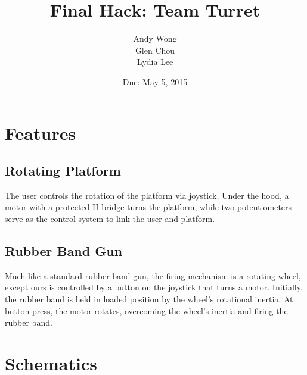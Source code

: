 \documentclass[a4paper, 11pt]{article}
\title{Final Hack: Team Turret}\author{Andy Wong\\Glen Chou\\Lydia Lee}\date{Due: May 5, 2015}
\begin{document}
\pagestyle{fancy}
\fancyhf{}
\maketitle
\tableofcontents

\newpage
\section{Features}
	\subsection{Rotating Platform}
		The user controls the rotation of the platform via joystick.  Under the hood, a motor with a protected H-bridge turns the platform, while two potentiometers serve as the control system to link the user and platform.
	\subsection{Rubber Band Gun}
		Much like a standard rubber band gun, the firing mechanism is a rotating wheel, except ours is controlled by a button on the joystick that turns a motor.  Initially, the rubber band is held in loaded position by the wheel's rotational inertia.  At button-press, the motor rotates, overcoming the wheel's inertia and firing the rubber band.
\newpage
\section{Schematics}
\end{document}
